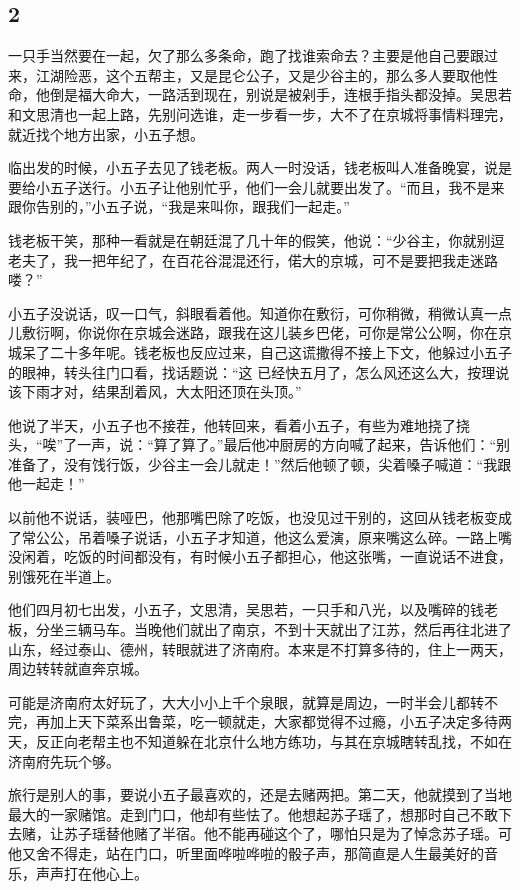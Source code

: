 {\centering\subsection{2}}

一只手当然要在一起，欠了那么多条命，跑了找谁索命去？主要是他自己要跟过来，江湖险恶，这个五帮主，又是昆仑公子，又是少谷主的，那么多人要取他性命，他倒是福大命大，一路活到现在，别说是被剁手，连根手指头都没掉。吴思若和文思清也一起上路，先别问选谁，走一步看一步，大不了在京城将事情料理完，就近找个地方出家，小五子想。

临出发的时候，小五子去见了钱老板。两人一时没话，钱老板叫人准备晚宴，说是要给小五子送行。小五子让他别忙乎，他们一会儿就要出发了。“而且，我不是来跟你告别的，”小五子说，“我是来叫你，跟我们一起走。”

钱老板干笑，那种一看就是在朝廷混了几十年的假笑，他说：“少谷主，你就别逗老夫了，我一把年纪了，在百花谷混混还行，偌大的京城，可不是要把我走迷路喽？”

小五子没说话，叹一口气，斜眼看着他。知道你在敷衍，可你稍微，稍微认真一点儿敷衍啊，你说你在京城会迷路，跟我在这儿装乡巴佬，可你是常公公啊，你在京城呆了二十多年呢。钱老板也反应过来，自己这谎撒得不接上下文，他躲过小五子的眼神，转头往门口看，找话题说：“这
已经快五月了，怎么风还这么大，按理说该下雨才对，结果刮着风，大太阳还顶在头顶。”

他说了半天，小五子也不接茬，他转回来，看着小五子，有些为难地挠了挠头，“唉”了一声，说：“算了算了。”最后他冲厨房的方向喊了起来，告诉他们：“别准备了，没有饯行饭，少谷主一会儿就走！”然后他顿了顿，尖着嗓子喊道：“我跟他一起走！”

以前他不说话，装哑巴，他那嘴巴除了吃饭，也没见过干别的，这回从钱老板变成了常公公，吊着嗓子说话，小五子才知道，他这么爱演，原来嘴这么碎。一路上嘴没闲着，吃饭的时间都没有，有时候小五子都担心，他这张嘴，一直说话不进食，别饿死在半道上。

他们四月初七出发，小五子，文思清，吴思若，一只手和八光，以及嘴碎的钱老板，分坐三辆马车。当晚他们就出了南京，不到十天就出了江苏，然后再往北进了山东，经过泰山、德州，转眼就进了济南府。本来是不打算多待的，住上一两天，周边转转就直奔京城。

可能是济南府太好玩了，大大小小上千个泉眼，就算是周边，一时半会儿都转不完，再加上天下菜系出鲁菜，吃一顿就走，大家都觉得不过瘾，小五子决定多待两天，反正向老帮主也不知道躲在北京什么地方练功，与其在京城瞎转乱找，不如在济南府先玩个够。

旅行是别人的事，要说小五子最喜欢的，还是去赌两把。第二天，他就摸到了当地最大的一家赌馆。走到门口，他却有些怯了。他想起苏子瑶了，想那时自己不敢下去赌，让苏子瑶替他赌了半宿。他不能再碰这个了，哪怕只是为了悼念苏子瑶。可他又舍不得走，站在门口，听里面哗啦哗啦的骰子声，那简直是人生最美好的音乐，声声打在他心上。


